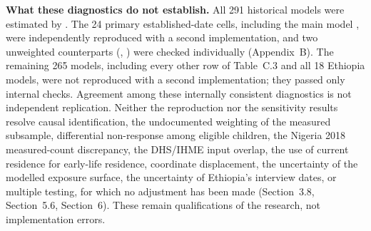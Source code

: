 \textbf{What these diagnostics do not establish.} All 291 historical models were estimated by . The 24 primary established-date cells, including the main model , were independently reproduced with a second implementation, and two unweighted counterparts (, ) were checked individually (Appendix~B). The remaining 265 models, including every other row of Table~C.3 and all 18 Ethiopia models, were not reproduced with a second implementation; they passed only internal checks. Agreement among these internally consistent diagnostics is not independent replication. Neither the reproduction nor the sensitivity results resolve causal identification, the undocumented weighting of the measured subsample, differential non-response among eligible children, the Nigeria 2018 measured-count discrepancy, the DHS/IHME input overlap, the use of current residence for early-life residence, coordinate displacement, the uncertainty of the modelled exposure surface, the uncertainty of Ethiopia's interview dates, or multiple testing, for which no adjustment has been made (Section~3.8, Section~5.6, Section~6). These remain qualifications of the research, not implementation errors.

\par\endgroup
